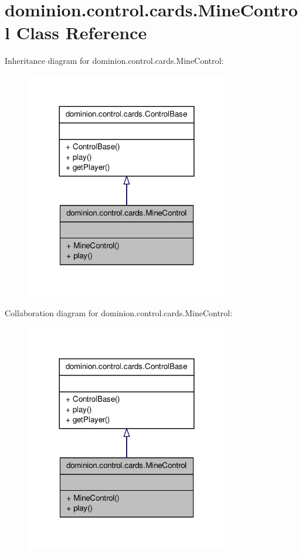 \hypertarget{classdominion_1_1control_1_1cards_1_1MineControl}{\section{dominion.\-control.\-cards.\-Mine\-Control \-Class \-Reference}
\label{classdominion_1_1control_1_1cards_1_1MineControl}
}


\-Inheritance diagram for dominion.\-control.\-cards.\-Mine\-Control\-:
\nopagebreak
\begin{figure}[H]
\begin{center}
\leavevmode
\includegraphics[width=252pt]{classdominion_1_1control_1_1cards_1_1MineControl__inherit__graph}
\end{center}
\end{figure}


\-Collaboration diagram for dominion.\-control.\-cards.\-Mine\-Control\-:
\nopagebreak
\begin{figure}[H]
\begin{center}
\leavevmode
\includegraphics[width=252pt]{classdominion_1_1control_1_1cards_1_1MineControl__coll__graph}
\end{center}
\end{figure}
